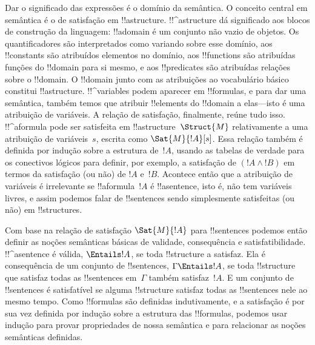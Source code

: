 \documentclass[../../../include/open-logic-section]{subfiles}
\begin{document}


Dar o significado das expressões é o domínio da semântica. O
conceito central em semântica é o de satisfação em
!!a{structure}. !!^a{structure} dá significado aos blocos de construção
da linguagem: !!a{domain} é um conjunto não vazio de objetos. Os
quantificadores são interpretados como variando sobre esse domínio, aos !!{constant}s
são atribuídos elementos no domínio, aos !!{function}s são atribuídas
funções do !!{domain} para si mesmo, e aos !!{predicate}s são
atribuídas relações sobre o !!{domain}. O !!{domain} junto com as
atribuições ao vocabulário básico constitui !!a{structure}.
!!^{variable}s podem aparecer em !!{formula}s, e para dar uma
semântica, também temos que atribuir !!{element}s do !!{domain} a
elas---isto é uma atribuição de variáveis. A relação de satisfação,
finalmente, reúne tudo isso. !!^a{formula} pode ser satisfeita em
!!a{structure}~$\Struct{M}$ relativamente a uma atribuição de variáveis~$s$,
escrita como $\Sat{M}{!A}[s]$. Essa relação também é definida por
indução sobre a estrutura de~$!A$, usando as tabelas de verdade para os
conectivos lógicos para definir, por exemplo, a satisfação de $(!A \land !B)$ em
termos da satisfação (ou não) de $!A$ e~$!B$. Acontece então
que a atribuição de variáveis é irrelevante se !!a{formula}~$!A$
é !!a{sentence}, isto é, não tem variáveis livres, e assim podemos falar de
!!{sentence}s sendo simplesmente satisfeitas (ou não) em !!{structure}s.

Com base na relação de satisfação $\Sat{M}{!A}$ para !!{sentence}s
podemos então definir as noções semânticas básicas de validade, consequência
e satisfatibilidade. !!^a{sentence} é válida, $\Entails !A$, se toda
!!{structure} a satisfaz. Ela é consequência de um conjunto de !!{sentence}s,
$\Gamma \Entails !A$, se toda !!{structure} que satisfaz todas as
!!{sentence}s em~$\Gamma$ também satisfaz~$!A$. E um conjunto de !!{sentence}s
é satisfatível se alguma !!{structure} satisfaz todas as !!{sentence}s nele
ao mesmo tempo. Como !!{formula}s são definidas indutivamente, e
a satisfação é por sua vez definida por indução sobre a estrutura das
!!{formula}s, podemos usar indução para provar propriedades de nossa
semântica e para relacionar as noções semânticas definidas.
\end{document}

